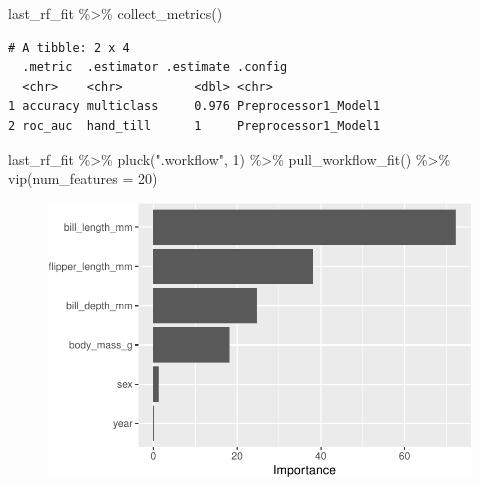\documentclass[
  letterpaper,
  DIV=11,
  numbers=noendperiod]{scrreprt}
\newenvironment{Shaded}{\begin{snugshade}}{\end{snugshade}}
\newcommand{\AttributeTok}[1]{\textcolor[rgb]{0.40,0.45,0.13}{#1}}
\newcommand{\DecValTok}[1]{\textcolor[rgb]{0.68,0.00,0.00}{#1}}
\newcommand{\FunctionTok}[1]{\textcolor[rgb]{0.28,0.35,0.67}{#1}}
\newcommand{\NormalTok}[1]{\textcolor[rgb]{0.00,0.23,0.31}{#1}}
\newcommand{\SpecialCharTok}[1]{\textcolor[rgb]{0.37,0.37,0.37}{#1}}
\newcommand{\StringTok}[1]{\textcolor[rgb]{0.13,0.47,0.30}{#1}}
\begin{document}
\begin{Shaded}
\begin{Highlighting}[]
\NormalTok{last\_rf\_fit }\SpecialCharTok{\%\textgreater{}\%} 
  \FunctionTok{collect\_metrics}\NormalTok{()}
\end{Highlighting}
\end{Shaded}

\begin{verbatim}
# A tibble: 2 x 4
  .metric  .estimator .estimate .config             
  <chr>    <chr>          <dbl> <chr>               
1 accuracy multiclass     0.976 Preprocessor1_Model1
2 roc_auc  hand_till      1     Preprocessor1_Model1
\end{verbatim}

\begin{Shaded}
\begin{Highlighting}[]
\NormalTok{last\_rf\_fit }\SpecialCharTok{\%\textgreater{}\%} 
  \FunctionTok{pluck}\NormalTok{(}\StringTok{".workflow"}\NormalTok{, }\DecValTok{1}\NormalTok{) }\SpecialCharTok{\%\textgreater{}\%}   
  \FunctionTok{pull\_workflow\_fit}\NormalTok{() }\SpecialCharTok{\%\textgreater{}\%} 
  \FunctionTok{vip}\NormalTok{(}\AttributeTok{num\_features =} \DecValTok{20}\NormalTok{)}
\end{Highlighting}
\end{Shaded}

\begin{figure}[H]

{\centering \includegraphics{./14-machine-learning_files/figure-pdf/unnamed-chunk-18-1.pdf}

}

\end{figure}
\end{document}
